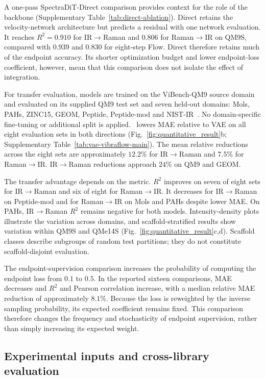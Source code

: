 A one-pass SpectraDiT-Direct comparison provides context for the role of the backbone (Supplementary Table~\ref{tab:direct-ablation}). Direct retains the velocity-network architecture but predicts a residual with one network evaluation. It reaches $R^2=0.910$ for IR$\rightarrow$Raman and $0.806$ for Raman$\rightarrow$IR on QM9S, compared with $0.939$ and $0.830$ for eight-step Flow. Direct therefore retains much of the endpoint accuracy. Its shorter optimization budget and lower endpoint-loss coefficient, however, mean that this comparison does not isolate the effect of integration.

For transfer evaluation, models are trained on the ViBench-QM9 source domain and evaluated on its supplied QM9 test set and seven held-out domains: Mols, PAHs, ZINC15, GEOM, Peptide, Peptide-mod and NIST-IR~\citep{lu2025vib2mol}. No domain-specific fine-tuning or additional split is applied. \mname\ lowers MAE relative to VAE on all eight evaluation sets in both directions (Fig.~\ref{fig:quantitative_result}b; Supplementary Table~\ref{tab:vae-vibraflow-main}). The mean relative reductions across the eight sets are approximately $12.2\%$ for IR$\rightarrow$Raman and $7.5\%$ for Raman$\rightarrow$IR. IR$\rightarrow$Raman reductions approach $24\%$ on QM9 and GEOM.

The transfer advantage depends on the metric. $R^2$ improves on seven of eight sets for IR$\rightarrow$Raman and six of eight for Raman$\rightarrow$IR. It decreases for IR$\rightarrow$Raman on Peptide-mod and for Raman$\rightarrow$IR on Mols and PAHs despite lower MAE. On PAHs, IR$\rightarrow$Raman $R^2$ remains negative for both models. Intensity-density plots illustrate the variation across domains, and scaffold-stratified results show variation within QM9S and QMe14S (Fig.~\ref{fig:quantitative_result}c,d). Scaffold classes describe subgroups of random test partitions; they do not constitute scaffold-disjoint evaluation.

The endpoint-supervision comparison increases the probability of computing the endpoint loss from $0.1$ to $0.5$. In the reported sixteen comparisons, MAE decreases and $R^2$ and Pearson correlation increase, with a median relative MAE reduction of approximately $8.1\%$. Because the loss is reweighted by the inverse sampling probability, its expected coefficient remains fixed. This comparison therefore changes the frequency and stochasticity of endpoint supervision, rather than simply increasing its expected weight.

\subsection*{Experimental inputs and cross-library evaluation}


